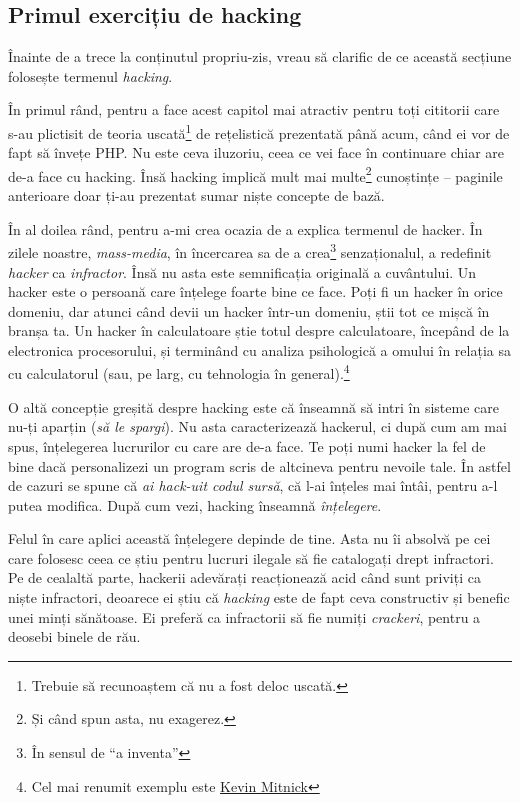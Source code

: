 \subsection{Primul exercițiu de hacking}

Înainte de a trece la conținutul propriu-zis, vreau să clarific de ce această secțiune
folosește termenul \textsl{hacking}.

În primul rând, pentru a face acest capitol mai
atractiv pentru toți cititorii care s-au plictisit de teoria uscată\footnote{Trebuie să
recunoaștem că nu a fost deloc uscată.} de rețelistică
prezentată până acum,
când ei vor de fapt să învețe PHP. Nu este ceva iluzoriu, ceea ce vei face în continuare
chiar are de-a face cu hacking. Însă hacking implică mult mai multe\footnote{Și când
spun asta, nu exagerez.}
 cunoștințe -- paginile
anterioare doar ți-au prezentat sumar niște concepte de bază.

În al doilea rând, pentru a-mi crea ocazia de a explica termenul de hacker.
În zilele noastre, \textsl{mass-media}, în încercarea sa de a crea\footnote{În
sensul de ``a inventa''} senzaționalul,
a redefinit \textsl{hacker} ca \textit{infractor}. Însă nu asta este semnificația
originală a cuvântului. Un hacker este o persoană care înțelege foarte bine ce
face. Poți fi un hacker în orice domeniu, dar atunci când devii un hacker într-un domeniu,
știi tot ce mișcă în branșa ta. Un hacker în calculatoare știe totul despre calculatoare,
începând de la electronica procesorului, și terminând cu analiza psihologică a
omului în relația sa cu
calculatorul (sau, pe larg, cu tehnologia în general).\footnote{Cel mai renumit exemplu este
\href{http://en.wikipedia.org/wiki/Kevin_Mitnick}{Kevin Mitnick}}

O altă concepție greșită despre hacking este că înseamnă să intri în sisteme care nu-ți
aparțin (\textit{să le spargi}). Nu asta caracterizează hackerul, ci după cum am mai spus,
înțelegerea lucrurilor cu care are de-a face. Te poți numi hacker la fel de bine
dacă personalizezi un program scris de altcineva pentru nevoile tale. În astfel
de cazuri se spune că \textsl{ai hack-uit codul sursă}, că l-ai înțeles mai întâi, pentru
a-l putea modifica. După cum vezi, hacking înseamnă \textit{înțelegere}.

Felul în care aplici această înțelegere depinde de tine. Asta nu îi absolvă pe
cei care folosesc ceea ce știu pentru lucruri ilegale să fie catalogați
drept infractori. Pe de cealaltă parte, hackerii adevărați reacționează acid
când sunt priviți ca niște infractori, deoarece ei
știu că \textsl{hacking} este de fapt ceva constructiv și benefic unei minți sănătoase.
Ei preferă ca infractorii să fie numiți \textsl{crackeri}, pentru a deosebi binele
de rău.

